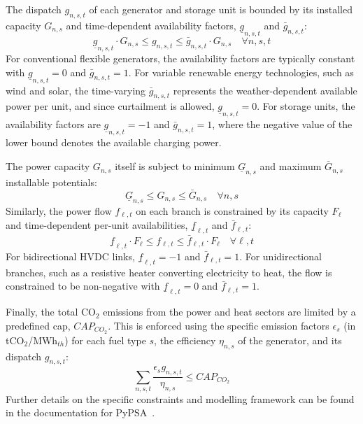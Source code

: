 \documentclass[preprint,12pt]{elsarticle}
\begin{document}
The dispatch $g_{n,s,t}$ of each generator and storage unit is bounded by its installed capacity $G_{n,s}$ and time-dependent availability factors, $\underline{g}_{n,s,t}$ and $\bar{g}_{n,s,t}$:
\begin{equation}
\underline{g}_{n,s,t} \cdot G_{n,s} \leq g_{n,s,t} \leq \bar{g}_{n,s,t} \cdot G_{n,s} \quad \forall n, s, t
\end{equation}
For conventional flexible generators, the availability factors are typically constant with $\underline{g}_{n,s,t} = 0$ and $\bar{g}_{n,s,t} = 1$. For variable renewable energy technologies, such as wind and solar, the time-varying $\bar{g}_{n,s,t}$ represents the weather-dependent available power per unit, and since curtailment is allowed, $\underline{g}_{n,s,t} = 0$. For storage units, the availability factors are $\underline{g}_{n,s,t} = -1$ and $\bar{g}_{n,s,t} = 1$, where the negative value of the lower bound denotes the available charging power.

The power capacity $G_{n,s}$ itself is subject to minimum $\underline{G}_{n,s}$ and maximum $\bar{G}_{n,s}$ installable potentials:
\begin{equation}
\underline{G}_{n,s} \leq G_{n,s} \leq \bar{G}_{n,s} \quad \forall n, s
\end{equation}
Similarly, the power flow $f_{\ell,t}$ on each branch is constrained by its capacity $F_{\ell}$ and time-dependent per-unit availabilities, $\underline{f}_{\ell,t}$ and $\bar{f}_{\ell,t}$:
\begin{equation}
\underline{f}_{\ell,t} \cdot F_{\ell} \leq f_{\ell,t} \leq \bar{f}_{\ell,t} \cdot F_{\ell} \quad \forall \ell, t
\end{equation}
For bidirectional HVDC links, $\underline{f}_{\ell,t} = -1$ and $\bar{f}_{\ell,t} = 1$. For unidirectional branches, such as a resistive heater converting electricity to heat, the flow is constrained to be non-negative with $\underline{f}_{\ell,t} = 0$ and $\bar{f}_{\ell,t} = 1$.

Finally, the total CO$_2$ emissions from the power and heat sectors are limited by a predefined cap, $CAP_{CO_2}$. This is enforced using the specific emission factors $\epsilon_s$ (in tCO$_2$/MWh$_{th}$) for each fuel type $s$, the efficiency $\eta_{n,s}$ of the generator, and its dispatch $g_{n,s,t}$:
\begin{equation}
\sum_{n,s,t} \frac{\epsilon_s g_{n,s,t}}{\eta_{n,s}} \leq CAP_{CO_2}
\end{equation}
Further details on the specific constraints and modelling framework can be found in the documentation for PyPSA~\citep{PyPSA}.
\end{document}
